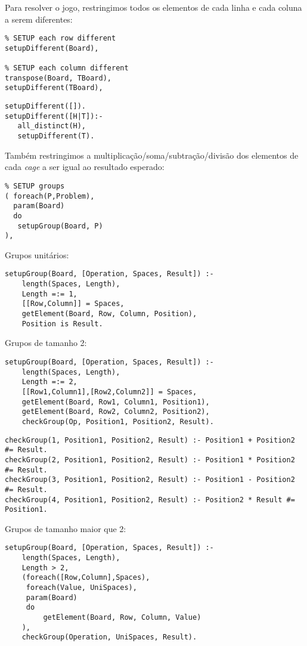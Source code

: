 \documentclass[runningheads,a4paper]{llncs}
\begin{document}
Para resolver o jogo, restringimos todos os elementos de cada linha e cada coluna a serem diferentes:

\begin{lstlisting}
% SETUP each row different
setupDifferent(Board),

% SETUP each column different
transpose(Board, TBoard),
setupDifferent(TBoard),
\end{lstlisting}

\begin{lstlisting}
setupDifferent([]).
setupDifferent([H|T]):-
   all_distinct(H),
   setupDifferent(T).
\end{lstlisting}

Também restringimos a multiplicação/soma/subtração/divisão dos elementos de cada \textit{cage} a ser igual ao resultado esperado:

\begin{lstlisting}
% SETUP groups
( foreach(P,Problem),
  param(Board)
  do
   setupGroup(Board, P)
),
\end{lstlisting}

Grupos unitários:

\begin{lstlisting}
setupGroup(Board, [Operation, Spaces, Result]) :-
    length(Spaces, Length),
    Length =:= 1,
    [[Row,Column]] = Spaces,
    getElement(Board, Row, Column, Position),
    Position is Result.
\end{lstlisting}

Grupos de tamanho 2:

\begin{lstlisting}
setupGroup(Board, [Operation, Spaces, Result]) :-
    length(Spaces, Length),
    Length =:= 2,
    [[Row1,Column1],[Row2,Column2]] = Spaces,
    getElement(Board, Row1, Column1, Position1),
    getElement(Board, Row2, Column2, Position2),
    checkGroup(Op, Position1, Position2, Result).
\end{lstlisting}

\begin{lstlisting}
checkGroup(1, Position1, Position2, Result) :- Position1 + Position2 #= Result.
checkGroup(2, Position1, Position2, Result) :- Position1 * Position2 #= Result.
checkGroup(3, Position1, Position2, Result) :- Position1 - Position2 #= Result.
checkGroup(4, Position1, Position2, Result) :- Position2 * Result #= Position1.
\end{lstlisting}

Grupos de tamanho maior que 2:

\begin{lstlisting}
setupGroup(Board, [Operation, Spaces, Result]) :-
    length(Spaces, Length),
    Length > 2,
    (foreach([Row,Column],Spaces),
     foreach(Value, UniSpaces),
     param(Board)
     do
         getElement(Board, Row, Column, Value)
    ),
    checkGroup(Operation, UniSpaces, Result).
\end{lstlisting}
\end{document}
